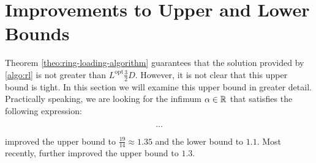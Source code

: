 \section{Improvements to Upper and Lower Bounds}

Theorem \cref{theo:ring-loading-algorithm} guarantees that the solution provided by \cref{algo:rl} is not greater than $L^\mathrm{opt}\frac{3}{2} D$.
However, it is not clear that this upper bound is tight.
In this section we will examine this upper bound in greater detail.
Practically speaking, we are looking for the infimum $\alpha \in \mathbb{R}$ that satisfies the following expression:

\begin{equation}
	...
\end{equation}

\citet{skutella16} improved the upper bound to $\frac{19}{14} \approx 1.35$ and the lower bound to $1.1$.
Most recently, \citet{daubel19} further improved the upper bound to $1.3$.